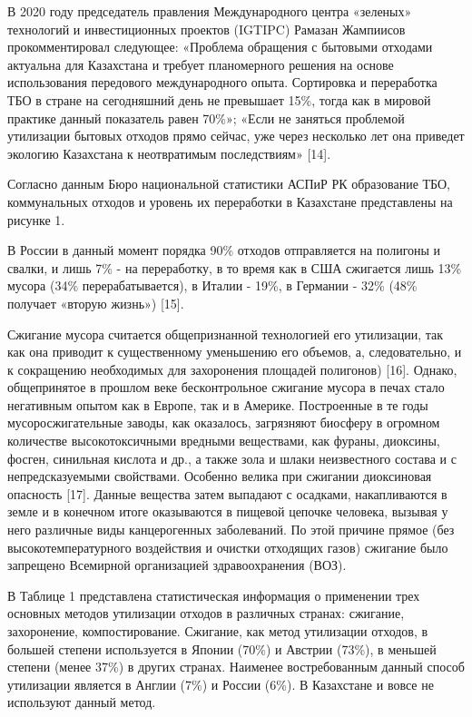 \begin{multicols}{2}
В 2020 году председатель правления Международного центра «зеленых»
технологий и инвестиционных проектов (IGTIPC) Рамазан Жампиисов
прокомментировал следующее: «Проблема обращения с бытовыми отходами
актуальна для Казахстана и требует планомерного решения на основе
использования передового международного опыта. Сортировка и переработка
ТБО в стране на сегодняшний день не превышает 15\%, тогда как в мировой
практике данный показатель равен 70\%»; «Если не заняться проблемой
утилизации бытовых отходов прямо сейчас, уже через несколько лет она
приведет экологию Казахстана к неотвратимым последствиям» {[}14{]}.~

Согласно данным Бюро национальной статистики АСПиР РК образование ТБО,
коммунальных отходов и уровень их переработки в Казахстане представлены
на рисунке 1.

В России в данный момент порядка 90\% отходов отправляется на полигоны и
свалки, и лишь 7\% - на переработку, в то время как в США сжигается лишь
13\% мусора (34\% перерабатывается), в Италии - 19\%, в Германии - 32\%
(48\% получает «вторую жизнь») {[}15{]}.

Сжигание мусора считается общепризнанной технологией его утилизации, так
как она приводит к существенному уменьшению его объемов, а,
следовательно, и к сокращению необходимых для захоронения площадей
полигонов) {[}16{]}. Однако, общепринятое в прошлом веке бесконтрольное
сжигание мусора в печах стало негативным опытом как в Европе, так и в
Америке. Построенные в те годы мусоросжигательные заводы, как оказалось,
загрязняют биосферу в огромном количестве высокотоксичными вредными
веществами, как фураны, диоксины, фосген, синильная кислота и др., а
также зола и шлаки неизвестного состава и с непредсказуемыми свойствами.
Особенно велика при сжигании диоксиновая опасность {[}17{]}. Данные
вещества затем выпадают с осадками, накапливаются в земле и в конечном
итоге оказываются в пищевой цепочке человека, вызывая у него различные
виды канцерогенных заболеваний. По этой причине прямое (без
высокотемпературного воздействия и очистки отходящих газов) сжигание
было запрещено Всемирной организацией здравоохранения (ВОЗ).

В Таблице 1 представлена статистическая информация о применении трех
основных методов утилизации отходов в различных странах: сжигание,
захоронение, компостирование. Сжигание, как метод утилизации отходов, в
большей степени используется в Японии (70\%) и Австрии (73\%), в меньшей
степени (менее 37\%) в других странах. Наименее востребованным данный
способ утилизации является в Англии (7\%) и России (6\%). В Казахстане и
вовсе не используют данный метод.
\end{multicols}

